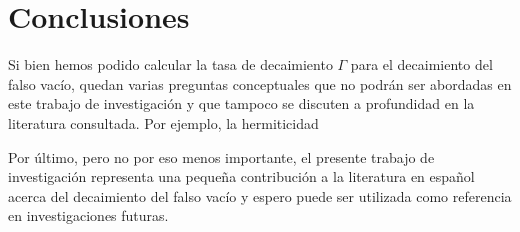 \chapter{Conclusiones}

Si bien hemos podido calcular la tasa de decaimiento $\Gamma$ para el decaimiento del falso vacío, quedan varias preguntas conceptuales que no podrán ser abordadas en este trabajo de investigación y que tampoco se discuten a profundidad en la literatura consultada. Por ejemplo, la hermiticidad 

Por último, pero no por eso menos importante, el presente trabajo de investigación representa una pequeña contribución a la literatura en español acerca del decaimiento del falso vacío y espero puede ser utilizada como referencia en investigaciones futuras. 